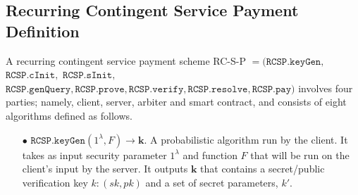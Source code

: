 
\subsection{Recurring Contingent Service Payment Definition}\label{sec::RC-S-P-Definition}


\begin{definition}[RC-S-P Scheme]\label{RC-S-P-def}
A recurring contingent service payment scheme RC-S-P  $=(\mathtt{RCSP}.\mathtt{keyGen}, $ $\mathtt{RCSP}.\mathtt{cInit}, $ $\mathtt{RCSP}.\mathtt{sInit},  $ $\mathtt{RCSP}.\mathtt{genQuery},\mathtt{RCSP}.\mathtt{prove},\mathtt{RCSP}.\mathtt{verify},\mathtt{RCSP}.\mathtt{resolve},\mathtt{RCSP}.\mathtt{pay})$ involves four parties; namely, client, server, arbiter and smart contract, and consists of eight algorithms defined as follows.


\begin{itemize}

\item[$\bullet$] $\mathtt{RCSP}.\mathtt{keyGen}(1^{\scriptscriptstyle\lambda},F)\rightarrow \bm{k}$.  A probabilistic algorithm run by the client. It takes as input security parameter $1^{\scriptscriptstyle\lambda}$  and  function $F$ that will be run on the client's input by the server. It outputs $\bm{k}$ that contains a secret/public verification key $k:(sk,pk)$ and a set of secret parameters, $k'$. %

\


\end{itemize}
\end{definition}
